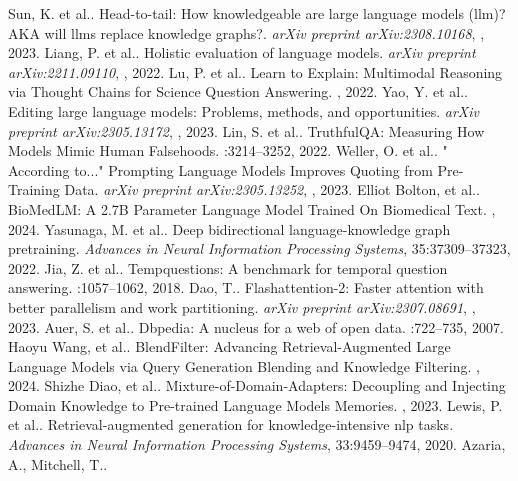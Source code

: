 \begin{thebibliography}{10}
\itemsep=1pt
\begin{small}

 Sun, K. et al.. 
\newblock Head-to-tail: How knowledgeable are large language models (llm)? AKA will llms replace knowledge graphs?. 
\newblock \emph{arXiv preprint arXiv:2308.10168}, , 2023.
 Liang, P. et al.. 
\newblock Holistic evaluation of language models. 
\newblock \emph{arXiv preprint arXiv:2211.09110}, , 2022.
 Lu, P. et al.. 
\newblock Learn to Explain: Multimodal Reasoning via Thought Chains for Science Question Answering. 
, 2022.
 Yao, Y. et al.. 
\newblock Editing large language models: Problems, methods, and opportunities. 
\newblock \emph{arXiv preprint arXiv:2305.13172}, , 2023.
 Lin, S. et al.. 
\newblock TruthfulQA: Measuring How Models Mimic Human Falsehoods. 
:3214--3252, 2022.
 Weller, O. et al.. 
\newblock " According to..." Prompting Language Models Improves Quoting from Pre-Training Data. 
\newblock \emph{arXiv preprint arXiv:2305.13252}, , 2023.
 Elliot Bolton,  et al.. 
\newblock BioMedLM: A 2.7B Parameter Language Model Trained On Biomedical Text. 
, 2024.
 Yasunaga, M. et al.. 
\newblock Deep bidirectional language-knowledge graph pretraining. 
\newblock \emph{Advances in Neural Information Processing Systems}, 35:37309--37323, 2022.
 Jia, Z. et al.. 
\newblock Tempquestions: A benchmark for temporal question answering. 
:1057--1062, 2018.
 Dao, T.. 
\newblock Flashattention-2: Faster attention with better parallelism and work partitioning. 
\newblock \emph{arXiv preprint arXiv:2307.08691}, , 2023.
 Auer, S. et al.. 
\newblock Dbpedia: A nucleus for a web of open data. 
:722--735, 2007.
 Haoyu Wang,  et al.. 
\newblock BlendFilter: Advancing Retrieval-Augmented Large Language Models via Query Generation Blending and Knowledge Filtering. 
, 2024.
 Shizhe Diao,  et al.. 
\newblock Mixture-of-Domain-Adapters: Decoupling and Injecting Domain Knowledge to Pre-trained Language Models Memories. 
, 2023.
 Lewis, P. et al.. 
\newblock Retrieval-augmented generation for knowledge-intensive nlp tasks. 
\newblock \emph{Advances in Neural Information Processing Systems}, 33:9459--9474, 2020.
 Azaria, A., Mitchell, T.. 

\end{small}
\end{thebibliography}

